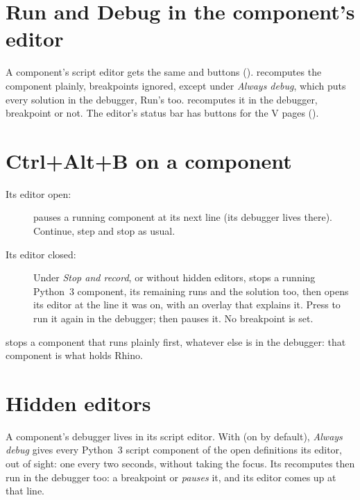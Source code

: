 \section{Run and Debug in the component's editor}\label{sec:ghrunbuttons}

A component's script editor gets the same  and  buttons ().  recomputes
the component plainly, breakpoints ignored, except under \emph{Always debug}, which puts every solution in the
debugger, Run's too.  recomputes it in the debugger, breakpoint or not. The editor's status bar has
buttons for the V pages ().

\section{Ctrl+Alt+B on a component}\label{sec:ghbreak}

\begin{description}
  \item[Its editor open:]  pauses a running component at its next line (its debugger lives
        there). Continue, step and stop as usual.
  \item[Its editor closed:] Under \emph{Stop and record}, or without hidden editors,  stops a running
        Python~3 component, its remaining runs and the solution too, then opens its editor at the line it was on,
        with an overlay that explains it. Press  to run it again in the debugger;  then
        pauses it. No breakpoint is set.
\end{description}

 stops a component that runs plainly first, whatever else is in the debugger: that component is
what holds Rhino.

\section{Hidden editors}\label{sec:hiddeneditors}

A component's debugger lives in its script editor. With  (on by
default), \emph{Always debug} gives every Python~3 script component of the open definitions its editor, out of
sight: one every two seconds, without taking the focus. Its recomputes then run in the debugger too: a breakpoint
or  \emph{pauses} it, and its editor comes up at that line.

